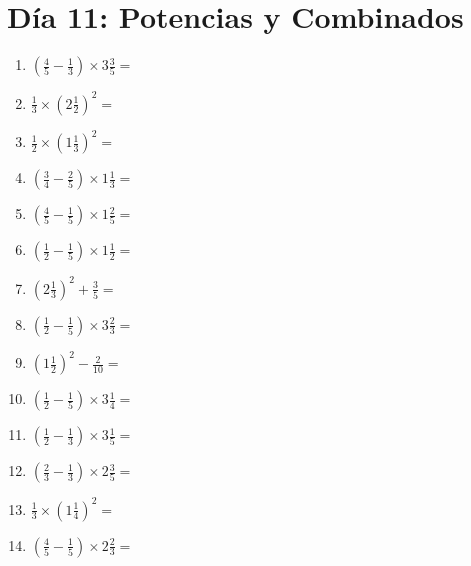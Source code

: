 \documentclass[12pt]{article}
\begin{document}
\section*{Día 11: Potencias y Combinados}
\begin{enumerate}
\item \large $ \left( \frac{4}{5} - \frac{1}{3} \right) \times 3 \frac{3}{5} = $ \vspace{1.6cm}
\item \large $ \frac{1}{3} \times \left( 2 \frac{1}{2} \right)^2 = $ \vspace{1.6cm}
\item \large $ \frac{1}{2} \times \left( 1 \frac{1}{3} \right)^2 = $ \vspace{1.6cm}
\item \large $ \left( \frac{3}{4} - \frac{2}{5} \right) \times 1 \frac{1}{3} = $ \vspace{1.6cm}
\item \large $ \left( \frac{4}{5} - \frac{1}{5} \right) \times 1 \frac{2}{5} = $ \vspace{1.6cm}
\item \large $ \left( \frac{1}{2} - \frac{1}{5} \right) \times 1 \frac{1}{2} = $ \vspace{1.6cm}
\item \large $ \left( 2 \frac{1}{3} \right)^2 + \frac{3}{5} = $ \vspace{1.6cm}
\item \large $ \left( \frac{1}{2} - \frac{1}{5} \right) \times 3 \frac{2}{3} = $ \vspace{1.6cm}
\item \large $ \left( 1 \frac{1}{2} \right)^2 - \frac{2}{10} = $ \vspace{1.6cm}
\item \large $ \left( \frac{1}{2} - \frac{1}{5} \right) \times 3 \frac{1}{4} = $ \vspace{1.6cm}
\newpage
\item \large $ \left( \frac{1}{2} - \frac{1}{3} \right) \times 3 \frac{1}{5} = $ \vspace{1.6cm}
\item \large $ \left( \frac{2}{3} - \frac{1}{3} \right) \times 2 \frac{3}{5} = $ \vspace{1.6cm}
\item \large $ \frac{1}{3} \times \left( 1 \frac{1}{4} \right)^2 = $ \vspace{1.6cm}
\item \large $ \left( \frac{4}{5} - \frac{1}{5} \right) \times 2 \frac{2}{3} = $ \vspace{1.6cm}

\end{enumerate}
\end{document}

